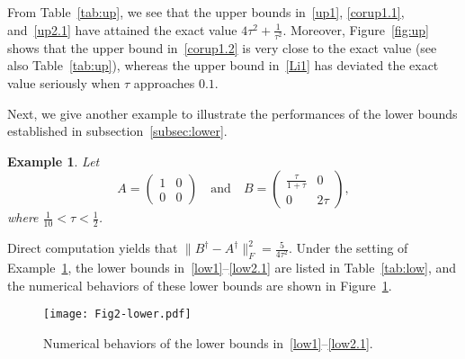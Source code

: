 \documentclass[11pt]{article}
\newtheorem{example}{Example}[section]
\begin{document}
From Table~\ref{tab:up}, we see that the upper bounds in~\eqref{up1}, \eqref{corup1.1}, and~\eqref{up2.1} have attained the exact value $4\tau^{2}+\frac{1}{\tau^{2}}$. Moreover, Figure~\ref{fig:up} shows that the upper bound in~\eqref{corup1.2} is very close to the exact value (see also Table~\ref{tab:up}), whereas the upper bound in~\eqref{Li1} has deviated the exact value seriously when $\tau$ approaches $0.1$.

Next, we give another example to illustrate the performances of the lower bounds established in subsection~\ref{subsec:lower}.

\begin{example}\rm\label{Ex2}
Let
\begin{displaymath}
A=\begin{pmatrix}
1 & 0 \\
0 & 0
\end{pmatrix} \quad \text{and} \quad B=\begin{pmatrix}
\frac{\tau}{1+\tau} & 0 \\
0 & 2\tau
\end{pmatrix},
\end{displaymath}
where $\frac{1}{10}<\tau<\frac{1}{2}$.
\end{example}

Direct computation yields that $\|B^{\dagger}-A^{\dagger}\|_{F}^{2}=\frac{5}{4\tau^{2}}$. Under the setting of Example~\ref{Ex2}, the lower bounds in~\eqref{low1}--\eqref{low2.1} are listed in Table~\ref{tab:low}, and the numerical behaviors of these lower bounds are shown in Figure~\ref{fig:low}.

\begin{table}[h!!]
\centering
{}
\caption{\small The lower bounds in~\eqref{low1}--\eqref{low2.1}.}
\label{tab:low}
\end{table}

\begin{figure}[h!!]
\centering
\texttt{[image: Fig2-lower.pdf]} 
\caption{\small Numerical behaviors of the lower bounds in~\eqref{low1}--\eqref{low2.1}.}
\label{fig:low}
\end{figure}
\end{document}
